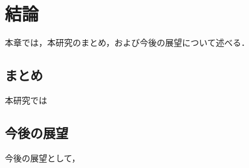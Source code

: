 \chapter{結論}
\vspace{-5mm}
本章では，本研究のまとめ，および今後の展望について述べる．
\vspace{-5mm}

\section{まとめ}

本研究では

\section{今後の展望}

今後の展望として，
